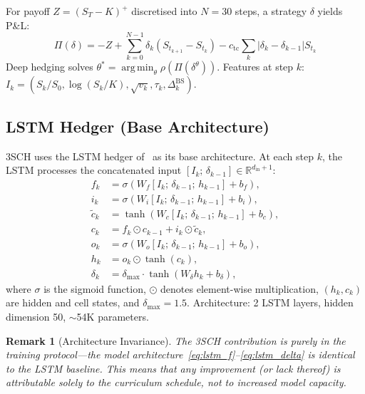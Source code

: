 \documentclass[11pt]{article}
\newtheorem{remark}[theorem]{Remark}
\newcommand{\R}{\mathbb{R}}
\DeclareMathOperator*{\argmin}{arg\,min}
\begin{document}
For payoff $Z = (S_T-K)^+$ discretised into $N=30$ steps, a strategy $\delta$ yields P\&L:
\begin{equation}
    \Pi(\delta) = -Z + \sum_{k=0}^{N-1} \delta_k (S_{t_{k+1}} - S_{t_k}) - c_{\mathrm{tc}}\sum_{k} |\delta_k - \delta_{k-1}| S_{t_k}
    \label{eq:pnl}
\end{equation}
Deep hedging solves $\theta^* = \argmin_\theta \rho(\Pi(\delta^\theta))$.  Features at step $k$: $I_k = (S_k/S_0, \log(S_k/K), \sqrt{v_k}, \tau_k, \Delta_k^{\mathrm{BS}})$.

\subsection{LSTM Hedger (Base Architecture)}

3SCH uses the LSTM hedger of~\citet{kozyra2019deep} as its base architecture.  At each step $k$, the LSTM processes the concatenated input $[I_k;\,\delta_{k-1}] \in \R^{d_{\mathrm{in}}+1}$:
\begin{align}
    f_k &= \sigma(W_f [I_k;\,\delta_{k-1};\,h_{k-1}] + b_f), \label{eq:lstm_f}\\
    i_k &= \sigma(W_i [I_k;\,\delta_{k-1};\,h_{k-1}] + b_i), \label{eq:lstm_i}\\
    \tilde{c}_k &= \tanh(W_c [I_k;\,\delta_{k-1};\,h_{k-1}] + b_c), \label{eq:lstm_ctilde}\\
    c_k &= f_k \odot c_{k-1} + i_k \odot \tilde{c}_k, \label{eq:lstm_c}\\
    o_k &= \sigma(W_o [I_k;\,\delta_{k-1};\,h_{k-1}] + b_o), \label{eq:lstm_o}\\
    h_k &= o_k \odot \tanh(c_k), \label{eq:lstm_h}\\
    \delta_k &= \delta_{\max} \cdot \tanh(W_{\delta} h_k + b_\delta), \label{eq:lstm_delta}
\end{align}
where $\sigma$ is the sigmoid function, $\odot$ denotes element-wise multiplication, $(h_k, c_k)$ are hidden and cell states, and $\delta_{\max}=1.5$.  Architecture: 2 LSTM layers, hidden dimension 50, $\sim$54K parameters.

\begin{remark}[Architecture Invariance]
The 3SCH contribution is \emph{purely in the training protocol}---the model architecture~\eqref{eq:lstm_f}--\eqref{eq:lstm_delta} is identical to the LSTM baseline.  This means that any improvement (or lack thereof) is attributable solely to the curriculum schedule, not to increased model capacity.
\end{remark}
\end{document}

